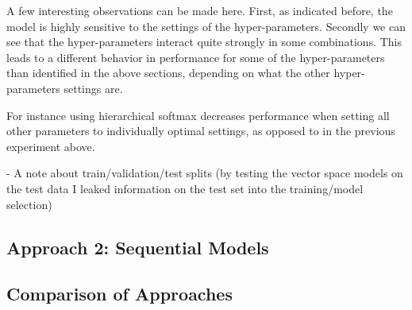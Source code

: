 A few interesting observations can be made here. First, as indicated before, the model is highly sensitive to the settings of the hyper-parameters. Secondly we can see that the hyper-parameters interact quite strongly in some combinations. This leads to a different behavior in performance for some of the hyper-parameters than identified in the above sections, depending on what the other hyper-parameters settings are.

For instance using hierarchical softmax decreases performance when setting all other parameters to individually optimal settings, as opposed to in the previous experiment above.


%

%

%

- A note about train/validation/test splits (by testing the vector space models on the test data I leaked information on the test set into the training/model selection)


\subsection{Approach 2: Sequential Models}
\label{sub:Approach 2: Sequential Models (Results)}



\subsection{Comparison of Approaches}
